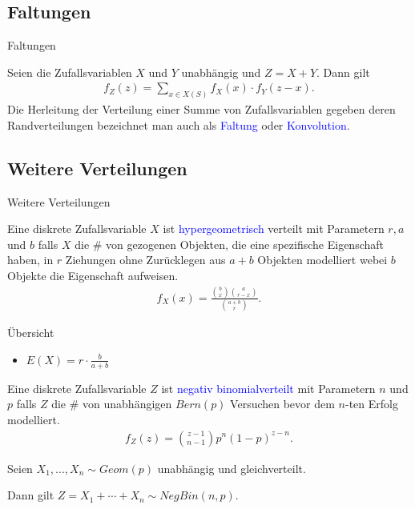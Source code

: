 \documentclass{beamer}
\def\b{\textcolor{blue}}
\begin{document}
\subsection{Faltungen}
\begin{frame}{Faltungen}
    \begin{definition}
        Seien die Zufallsvariablen $X$ und $Y$ unabhängig und $Z = X + Y$. Dann gilt
        \begin{align*}
            f_Z(z) = \sum_{x \in X(S)} f_X(x) \cdot f_Y(z - x).
        \end{align*}\pause
        Die Herleitung der Verteilung einer Summe von Zufallsvariablen gegeben deren Randverteilungen bezeichnet man auch als \b{Faltung} oder \b{Konvolution}.
    \end{definition}
\end{frame}

\subsection{Weitere Verteilungen}
\begin{frame}{Weitere Verteilungen}
    \begin{definition}
        Eine diskrete Zufallsvariable $X$ ist \b{hypergeometrisch} verteilt mit Parametern $r, a$ und $b$ falls $X$ die \# von gezogenen Objekten, die eine spezifische Eigenschaft haben, in $r$ Ziehungen ohne Zurücklegen aus $a + b$ Objekten modelliert webei $b$ Objekte die Eigenschaft aufweisen.\pause
        \begin{align*}
            f_X(x) = \frac{{b \choose x}{a \choose r - x}}{{a + b \choose r}}.
        \end{align*}\pause
        \begin{exampleblock}{Übersicht}
            \begin{itemize}
                \item $E(X) = r \cdot \frac{b}{a + b}$
            \end{itemize}
        \end{exampleblock}
    \end{definition}
\end{frame}

\begin{frame}
    \begin{definition}
        Eine diskrete Zufallsvariable $Z$ ist \b{negativ binomialverteilt} mit Parametern $n$ und $p$ falls $Z$ die \# von unabhängigen $Bern(p)$ Versuchen bevor dem $n$-ten Erfolg modelliert.\pause
        \begin{align*}
            f_Z(z) = {z - 1 \choose n - 1} p^n (1 - p)^{z - n}.
        \end{align*}\pause
        \begin{example}
            Seien $X_1, \dots, X_n \sim Geom(p)$ unabhängig und gleichverteilt.\par
            Dann gilt $Z = X_1 + \cdots + X_n \sim NegBin(n,p)$.
        \end{example}
    \end{definition}
\end{frame}
\end{document}
